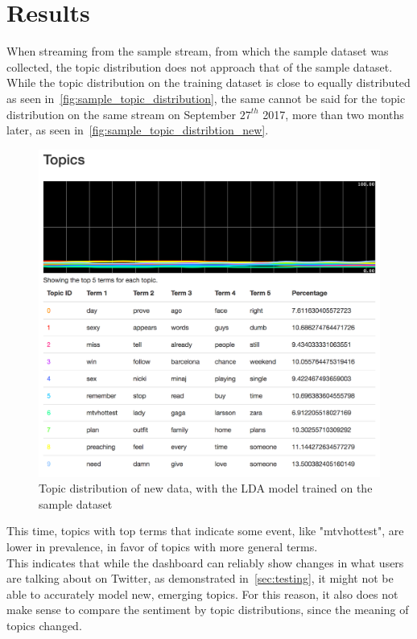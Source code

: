 \chapter{Results}
\label{ch:results}

When streaming from the sample stream, from which the sample dataset was collected,
the topic distribution does not approach that of the sample dataset.
While the topic distribution on the training dataset is close to equally distributed as seen in~\autoref{fig:sample_topic_distribution},
the same cannot be said for the topic distribution on the same stream on September $27^{th}$ 2017, more than two months later,
as seen in~\autoref{fig:sample_topic_distribtion_new}.

\begin{figure}
    \centering
    \caption{Topic distribution of new data, with the LDA model trained on the sample dataset}
    \label{fig:sample_topic_distribtion_new}
    \includegraphics[width=\textwidth]{../images/dashboard_topics_sample.png}
\end{figure}

This time, topics with top terms that indicate some event, like "mtvhottest", are lower in prevalence,
in favor of topics with more general terms.\\
This indicates that while the dashboard can reliably show changes in what users are talking about on Twitter,
as demonstrated in~\autoref{sec:testing},
it might not be able to accurately model new, emerging topics.
For this reason, it also does not make sense to compare the sentiment by topic distributions,
since the meaning of topics changed.

